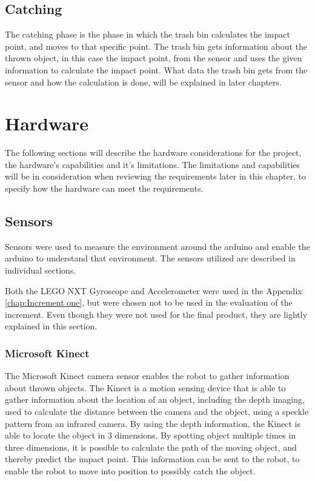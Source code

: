 \subsection{Catching}
\label{sec:CatchingAnalysis}
The catching phase is the phase in which the trash bin calculates the impact point, and moves to that specific point. The trash bin gets information about the thrown object, in this case the impact point, from the sensor and uses the given information to calculate the impact point. What data the trash bin gets from the sensor and how the calculation is done, will be explained in later chapters. 

\section{Hardware}
\label{sec:Hardware} 
The following sections will describe the hardware considerations for the project, the hardware’s capabilities and it’s limitations. The limitations and capabilities will be in consideration when reviewing the requirements later in this chapter, to specify how the hardware can meet the requirements.

\subsection{Sensors}
\label{sec:Sensors}
Sensors were used to measure the environment around the arduino and enable the arduino to understand that environment. The sensors utilized are described in individual sections. 

Both the LEGO NXT Gyroscope and Accelerometer were used in the Appendix \ref{chap:Increment one}, but were chosen not to be used in the evaluation of the increment. Even though they were not used for the final product, they are lightly explained in this section.

\subsubsection{Microsoft Kinect}
\label{sec:Microsoft Kinect}
The Microsoft Kinect camera sensor enables the robot to gather information about thrown objects. The Kinect is a motion sensing device that is able to gather information about the location of an object, including the depth imaging, used to calculate the distance between the camera and the object, using a speckle pattern from an infrared camera. By using the depth information, the Kinect is able to locate the object in 3 dimensions.
By spotting object multiple times in three dimensions, it is possible to calculate the path of the moving object, and thereby predict the impact point. This information can be sent to the robot, to enable the robot to move into position to possibly catch the object.

